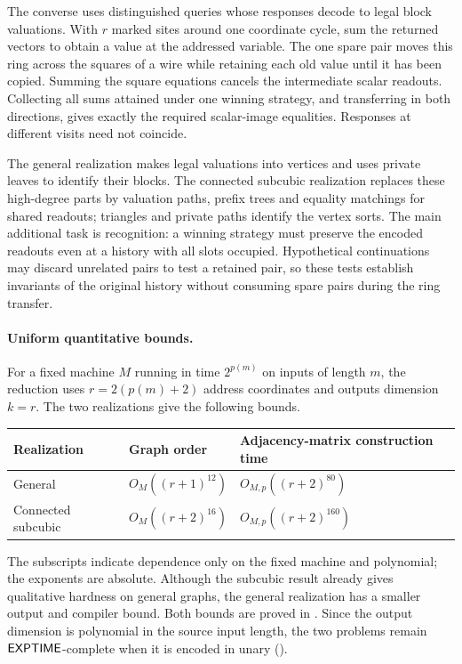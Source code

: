 The converse uses distinguished queries whose responses decode to legal
block valuations. With \(r\) marked sites around one coordinate cycle,
sum the returned vectors to obtain a value at the addressed variable.
The one spare pair moves this ring across the squares of a wire while
retaining each old value until it has been copied. Summing the square
equations cancels the intermediate scalar readouts. Collecting all sums
attained under one winning strategy, and transferring in both directions,
gives exactly the required scalar-image equalities. Responses at different
visits need not coincide.

The general realization makes legal valuations into vertices and uses
private leaves to identify their blocks. The connected subcubic
realization replaces these high-degree parts by valuation paths,
prefix trees and equality matchings for shared readouts; triangles and
private paths identify the vertex sorts. The main additional task is
recognition: a winning strategy must preserve the encoded readouts
even at a history with all slots occupied. Hypothetical continuations
may discard unrelated pairs to test a retained pair, so these tests
establish invariants of the original history without consuming spare
pairs during the ring transfer.

\paragraph{Uniform quantitative bounds.}
For a fixed machine \(M\) running in time \(2^{p(m)}\) on inputs of
length \(m\), the reduction uses
\(r=2(p(m)+2)\) address coordinates and outputs dimension \(k=r\).
The two realizations give the following bounds.
\begin{center}
\begin{tabular}{@{}lll@{}}
\toprule
Realization & Graph order & Adjacency-matrix construction time\\
\midrule
General & \(O_M((r+1)^{12})\) & \(O_{M,p}((r+2)^{80})\)\\
Connected subcubic & \(O_M((r+2)^{16})\) & \(O_{M,p}((r+2)^{160})\)\\
\bottomrule
\end{tabular}
\end{center}
The subscripts indicate dependence only on the fixed machine and
polynomial; the exponents are absolute. Although the subcubic result
already gives qualitative hardness on general graphs, the general
realization has a smaller output and compiler bound. Both bounds are
proved in .
Since the output dimension is polynomial in the source input length,
the two problems remain \(\mathsf{EXPTIME}\)-complete when it is encoded in
unary ().

